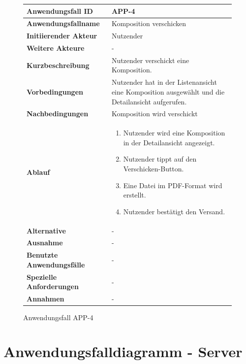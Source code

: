 \begin{figure}[h]
	\centering
	\begin{tabularx}{\textwidth}{ X | X }
		\textbf{Anwendungsfall ID} & APP-4 \\ \hline
		\textbf{Anwendungsfallname} & Komposition verschicken \\ \hline
		\textbf{Initiierender Akteur} & Nutzender
		 \\ \hline
		\textbf{Weitere Akteure} & -  \\ \hline
		\textbf{Kurzbeschreibung} & Nutzender verschickt eine Komposition.  \\ \hline
		\textbf{Vorbedingungen} & Nutzender hat in der Listenansicht eine Komposition ausgewählt und die Detailansicht aufgerufen.  \\ \hline
		\textbf{Nachbedingungen} & Komposition wird verschickt  \\ \hline
		\textbf{Ablauf} &
		\begin{enumerate}
			\item Nutzender wird eine Komposition in der Detailansicht angezeigt.
			\item Nutzender tippt auf den Verschicken-Button.
			\item Eine Datei im PDF-Format wird erstellt.
			\item Nutzender bestätigt den Versand.
		\end{enumerate} \\ \hline
		\textbf{Alternative} &
		-  \\ \hline
		\textbf{Ausnahme} &
		- \\ \hline
		\textbf{Benutzte Anwendungsfälle} & - \\ \hline
		\textbf{Spezielle Anforderungen} & - \\ \hline
		\textbf{Annahmen} & -
	\end{tabularx}
	\caption{Anwendungsfall APP-4}
	\label{fig:anwendungsfall-app-tabelle-APP-4}
\end{figure}

\newpage


\section{Anwendungsfalldiagramm - Server}

